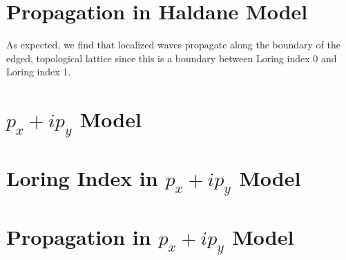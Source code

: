 \documentclass[a4paper]{article}
\begin{document}
\section{Propagation in Haldane Model}
As expected, we find that localized waves propagate along the boundary of the edged, topological lattice since this is a boundary between Loring index 0 and Loring index 1.


\section{\texorpdfstring{$p_x + ip_y$}{px + ipy} Model}
\section{Loring Index in \texorpdfstring{$p_x + ip_y$}{px + ipy} Model}
\section{Propagation in \texorpdfstring{$p_x + ip_y$}{px + ipy} Model}
\end{document}
